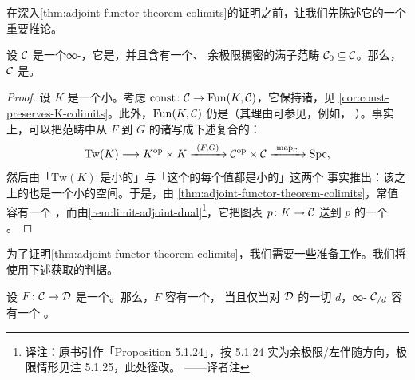 在深入\cref{thm:adjoint-functor-theorem-colimits}的证明之前，让我们先陈述它的一个
重要推论。

\begin{corollary}\label{cor:cocomplete-implies-complete}
设 $\mathcal{C}$ 是一个\trLocallySmall{}∞-\trCategory{}，它是\trCocomplete{}，并且含有一个\trEssentiallySmall{}、
余极限稠密的满子范畴 $\mathcal{C}_0 \subseteq \mathcal{C}$。那么，$\mathcal{C}$ 是\trComplete{}。
\end{corollary}

\begin{proof}
设 $K$ 是一个小\trSimplicialSet{}。考虑\trFunctor{}%
$\mathrm{const}\colon \mathcal{C} \to \mathrm{Fun}(K, \mathcal{C})$，它保持诸\trColimit{}，见
\cref{cor:const-preserves-K-colimits}。此外，$\mathrm{Fun}(K, \mathcal{C})$ 仍是\trLocallySmall{}（其理由可参见，例如，
\cite[Example 5.4.1.8]{Lur09}）。事实上，可以把\trFunctor{}范畴中从 $F$ 到 $G$
的诸\trMappingSpace{}写成下述复合的\trLimit{}：
\[
\mathrm{Tw}(K) \longrightarrow K^{\mathrm{op}} \times K
  \xrightarrow{\ (F, G)\ } \mathcal{C}^{\mathrm{op}} \times \mathcal{C}
  \xrightarrow{\ \mathrm{map}_{\mathcal{C}}\ } \mathrm{Spc},
\]
然后由「$\mathrm{Tw}(K)$ 是小的」与「这个\trFunctor{}的每个值都是小的」这两个
事实推出：该\trFunctor{}之上的\trLimit{}也是一个小的空间。于是，由%
\cref{thm:adjoint-functor-theorem-colimits}，常值\trFunctor{}容有一个%
\trRightAdjoint{}，而由\cref{rem:limit-adjoint-dual}\footnote{译注：原书引作「Proposition
5.1.24」，按 5.1.24 实为余极限/左伴随方向，极限情形见注 5.1.25，此处径改。
——译者注}，它把图表 $p\colon K \to \mathcal{C}$ 送到 $p$ 的一个%
\trLimit{}。
\end{proof}

为了证明\cref{thm:adjoint-functor-theorem-colimits}，我们需要一些准备工作。我们将
使用下述获取\trRightAdjoint{}的判据。

\begin{proposition}\label{prop:right-adjoint-terminal-slice}
设 $F\colon \mathcal{C} \to \mathcal{D}$ 是一个\trFunctor{}。那么，$F$ 容有一个\trRightAdjoint{}，
当且仅当对 $\mathcal{D}$ 的一切\trObject{} $d$，∞-\trCategory{} $\mathcal{C}_{/d}$ 容有一个%
\trTerminalObject{}。
\end{proposition}

